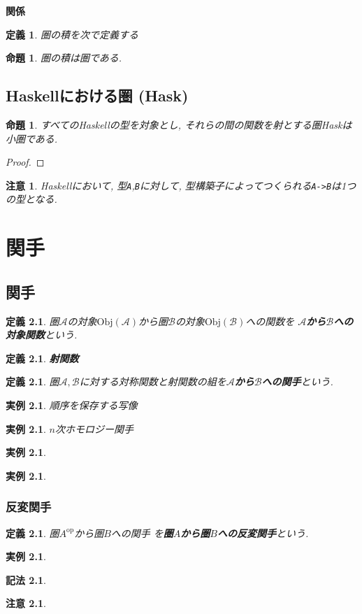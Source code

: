 \documentclass[dvipdfmx]{jsbook}
\theoremstyle{plain}
\newtheorem{Def}[thm]{定義}
\newtheorem{Notation}[thm]{記法}
\newtheorem{Prop}[thm]{命題}
\newtheorem{caution}[thm]{注意}
\newtheorem{example}[thm]{実例}
\begin{document}
{\bf 関係}

\begin{Def}
圏の積を次で定義する
\end{Def}
\begin{Prop}
圏の積は圏である.
\end{Prop}
\section{Haskellにおける圏 (Hask)}
\begin{Prop}
すべてのHaskellの型を対象とし, それらの間の関数を射とする圏Haskは小圏である.
\end{Prop}
\begin{proof}
\end{proof}
\begin{caution}
Haskellにおいて, 型\verb|A|,\verb|B|に対して, 型構築子によってつくられる\verb|A->B|は1つの型となる.
\end{caution}
\chapter{関手}
\section{関手}
\begin{Def}
圏$\mathscr{A}$の対象$\mathrm{Obj}(\mathscr{A})$から圏$\mathscr{B}$の対象$\mathrm{Obj}(\mathscr{B})$への関数を
{\bf $\mathscr{A}$から$\mathscr{B}$への対象関数}という.
\end{Def}
\begin{Def}
{\bf 射関数}
\end{Def}
\begin{Def}
圏$\mathscr{A},\mathscr{B}$に対する対称関数と射関数の組を{\bf $\mathscr{A}$から$\mathscr{B}$への関手}という.
\end{Def}
\begin{example}
順序を保存する写像
\end{example}
\begin{example}
$n$次ホモロジー関手
\end{example}
\begin{example}
\end{example}
\begin{example}
\end{example}
\subsection{反変関手}
\begin{Def}
圏$A^{\mathrm{op}}$から圏$B$への関手
を{\bf 圏$A$から圏$B$への反変関手}という.
\end{Def}
\begin{example}
\end{example}
\begin{Notation}
\end{Notation}
\begin{caution}
\end{caution}
\end{document}

